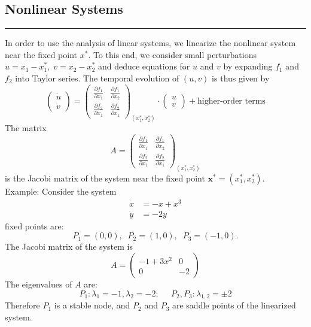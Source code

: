 \subsection{Nonlinear Systems}
\noindent\rule[\linienAbstand]{\linewidth}{\linienDicke}
In order to use the analysis of linear systems, we linearize the nonlinear system near the fixed point $x^*$. To this end, we consider small perturbations $u = x_1 - x^*_1, \; v = x_2 - x^*_2$ and deduce equations for $u$ and $v$ by expanding $f_1$ and $f_2$ into Taylor series. The temporal evolution of $(u, v)$ is thus given by
\begin{equation}
  \begin{pmatrix} \dot{u} \\ \dot{v} \end{pmatrix} =
  \begin{pmatrix} \frac{\partial f_1}{\partial x_1} & \frac{\partial f_1}{\partial x_2}\\
                  \frac{\partial f_2}{\partial x_1} & \frac{\partial f_2}{\partial x_1}
  \end{pmatrix}_{(x_1^*, x_2^*)} \cdot
  \begin{pmatrix} u \\ v \end{pmatrix} + \text{higher-order terms}
\end{equation}
The matrix
\begin{equation}
  A =   \begin{pmatrix} \frac{\partial f_1}{\partial x_1} & \frac{\partial f_1}{\partial x_2}\\
                        \frac{\partial f_2}{\partial x_1} & \frac{\partial f_2}{\partial x_1}
        \end{pmatrix}_{(x_1^*, x_2^*)}
\end{equation}
is the Jacobi matrix of the system near the fixed point $\textbf{x}^* = (x_1^*, x_2^*)$.\\

Example: Consider the system
\begin{equation}
  \begin{split}
    \dot{x} &= -x + x^3\\
    \dot{y} &= -2y
  \end{split}
\end{equation}
fixed points are:
\begin{equation}
  P_1 = (0, 0), \;\; P_2 = (1, 0), \;\; P_3 = (-1, 0).
\end{equation}
The Jacobi matrix of the system is
\begin{equation}
  A = \begin{pmatrix}
      -1+3x^2 & 0 \\
      0 & -2
  \end{pmatrix}
\end{equation}
The eigenvalues of $A$ are:
\begin{equation}
  P_1: \lambda_1 = -1, \lambda_2 = -2; \;\;\;\;\; P_2, P_3: \lambda_{1,2} = \pm 2
\end{equation}
Therefore $P_1$ is a stable node, and $P_2$ and $P_3$ are saddle points of the linearized system.\\

